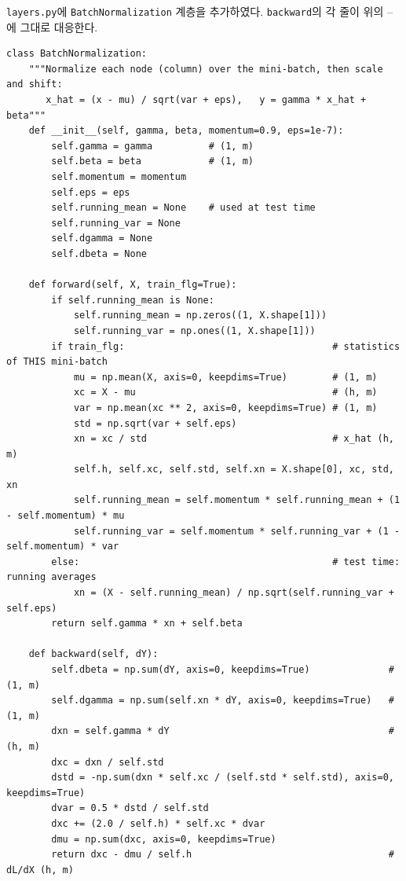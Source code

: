 \documentclass[11pt,a4paper]{article}
\begin{document}
\texttt{layers.py}에 \texttt{BatchNormalization} 계층을 추가하였다.
\texttt{backward}의 각 줄이 위의 --에 그대로 대응한다.
\begin{lstlisting}
class BatchNormalization:
    """Normalize each node (column) over the mini-batch, then scale and shift:
       x_hat = (x - mu) / sqrt(var + eps),   y = gamma * x_hat + beta"""
    def __init__(self, gamma, beta, momentum=0.9, eps=1e-7):
        self.gamma = gamma          # (1, m)
        self.beta = beta            # (1, m)
        self.momentum = momentum
        self.eps = eps
        self.running_mean = None    # used at test time
        self.running_var = None
        self.dgamma = None
        self.dbeta = None

    def forward(self, X, train_flg=True):
        if self.running_mean is None:
            self.running_mean = np.zeros((1, X.shape[1]))
            self.running_var = np.ones((1, X.shape[1]))
        if train_flg:                                     # statistics of THIS mini-batch
            mu = np.mean(X, axis=0, keepdims=True)        # (1, m)
            xc = X - mu                                   # (h, m)
            var = np.mean(xc ** 2, axis=0, keepdims=True) # (1, m)
            std = np.sqrt(var + self.eps)
            xn = xc / std                                 # x_hat (h, m)
            self.h, self.xc, self.std, self.xn = X.shape[0], xc, std, xn
            self.running_mean = self.momentum * self.running_mean + (1 - self.momentum) * mu
            self.running_var = self.momentum * self.running_var + (1 - self.momentum) * var
        else:                                             # test time: running averages
            xn = (X - self.running_mean) / np.sqrt(self.running_var + self.eps)
        return self.gamma * xn + self.beta

    def backward(self, dY):
        self.dbeta = np.sum(dY, axis=0, keepdims=True)              # (1, m)
        self.dgamma = np.sum(self.xn * dY, axis=0, keepdims=True)   # (1, m)
        dxn = self.gamma * dY                                       # (h, m)
        dxc = dxn / self.std
        dstd = -np.sum(dxn * self.xc / (self.std * self.std), axis=0, keepdims=True)
        dvar = 0.5 * dstd / self.std
        dxc += (2.0 / self.h) * self.xc * dvar
        dmu = np.sum(dxc, axis=0, keepdims=True)
        return dxc - dmu / self.h                                   # dL/dX (h, m)
\end{lstlisting}
\end{document}
